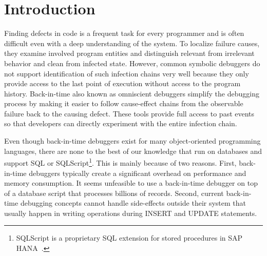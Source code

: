 \documentclass[english]{sig-alternate-05-2015}
\newcommand{\todo}[2][]{\pdfmargincomment[author={#1}]{#2}}
\begin{document}




\section{Introduction}

Finding defects in code is a frequent task for every programmer and is often difficult even with a deep understanding of the system.
To localize failure causes, they examine involved program entities and distinguish relevant from irrelevant behavior and clean from infected state. 
However, common symbolic debuggers do not support identification of such infection chains very well because they only provide access to the last point of execution without access to the program history.
Back-in-time also known as omniscient debuggers simplify the debugging process \todo{cite} by making it easier to follow cause-effect chains from the observable failure back to the causing defect.
These tools provide full access to past events so that developers can directly experiment with the entire infection chain. 

Even though back-in-time debuggers exist for many object-oriented programming languages\todo{cite}, there are none to the best of our knowledge that run on databases and support SQL or SQLScript\footnote{SQLScript is a proprietary SQL extension for stored procedures in SAP HANA~\cite{sqlScript}.}.
This is mainly because of two reasons. 
First, back-in-time debuggers typically create a significant overhead on performance and memory consumption\todo{cite}.
It seems unfeasible to use a back-in-time debugger on top of a database script that processes billions of records.
Second, current back-in-time debugging concepts cannot handle side-effects outside their system that usually happen in writing operations during INSERT and UPDATE statements. 
\end{document}
